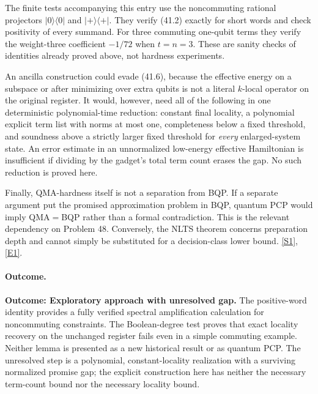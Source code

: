 \documentclass[11pt,a4paper]{article}
\newcommand{\sref}[2]{\hyperlink{source:#1:#2}{[S#2]}}
\newcommand{\eref}[2]{\hyperlink{extra:#1:#2}{[E#2]}}
\numberwithin{equation}{section}
\begin{document}
The finite tests accompanying this entry use the noncommuting rational
projectors $|0\rangle\langle0|$ and $|+\rangle\langle+|$. They verify
(41.2) exactly for short words and check positivity of every summand.
For three commuting one-qubit terms they verify the weight-three
coefficient $-1/72$ when $t=n=3$. These are sanity checks of identities
already proved above, not hardness experiments.

An ancilla construction could evade (41.6), because the effective energy
on a subspace or after minimizing over extra qubits is not a literal
$k$-local operator on the original register. It would, however, need all
of the following in one deterministic polynomial-time reduction:
constant final locality, a polynomial explicit term list with norms at
most one, completeness below a fixed threshold, and soundness above a
strictly larger fixed threshold for \emph{every} enlarged-system state.
An error estimate in an unnormalized low-energy effective Hamiltonian is
insufficient if dividing by the gadget's total term count erases the gap.
No such reduction is proved here.

Finally, QMA-hardness itself is not a separation from BQP. If a separate
argument put the promised approximation problem in BQP, quantum PCP would
imply QMA$=$BQP rather than a formal contradiction. This is the relevant
dependency on Problem 48. Conversely, the NLTS theorem concerns preparation
depth and cannot simply be substituted for a decision-class lower bound.
\sref{41}{1}, \eref{41}{1}.

\paragraph{Outcome.}
\textbf{Outcome: Exploratory approach with unresolved gap.}
The positive-word identity provides a fully verified spectral
amplification calculation for noncommuting constraints. The Boolean-degree
test proves that exact locality recovery on the unchanged register fails
even in a simple commuting example. Neither lemma is presented as a new
historical result or as quantum PCP. The unresolved step is a polynomial,
constant-locality realization with a surviving normalized promise gap;
the explicit construction here has neither the necessary term-count bound
nor the necessary locality bound.
\end{document}
